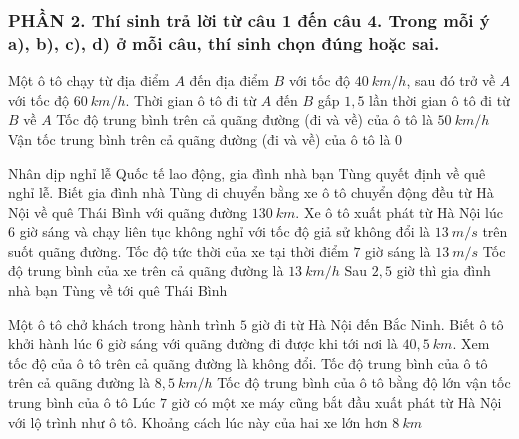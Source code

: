 \subsubsection*{PHẦN 2. Thí sinh trả lời từ câu 1 đến câu 4. Trong mỗi ý a), b), c), d) ở mỗi câu, thí sinh chọn đúng hoặc sai.}
\setcounter{ex}{0}
\begin{ex}%
Một ô tô chạy từ địa điểm $A$ đến địa điểm $B$ với tốc độ $40 \ km/h$, sau đó trở về $A$ với tốc độ $60\ km/h$.
{\True Thời gian ô tô đi từ $A$ đến $B$ gấp $1,5$ lần thời gian ô tô đi từ $B$ về $A$} 
{Tốc độ trung bình trên cả quãng đường (đi và về) của ô tô là $50 \ km/h$} 
{\True Vận tốc trung bình trên cả quãng đường (đi và về) của ô tô là $0$} 
\loigiai{ 
\begin{itemchoice}
\itemch
\itemch
\itemch
\itemch
\end{itemchoice}
}
\end{ex}
\begin{ex}%
Nhân dịp nghỉ lễ Quốc tế lao động, gia đình nhà bạn Tùng quyết định về quê nghỉ lễ. Biết gia đình nhà Tùng di chuyển bằng xe ô tô chuyển động đều từ Hà Nội về quê Thái Bình với quãng đường $130\ km$. Xe ô tô xuất phát từ Hà Nội lúc $6$ giờ sáng và chạy liên tục không nghỉ với tốc độ giả sử không đổi là $13\ m/s$ trên suốt quãng đường.
{\True Tốc độ tức thời của xe tại thời điểm $7$ giờ sáng là $13 \ m/s$} 
{Tốc độ trung bình của xe trên cả quãng đường là $13 \ km/h$} 
{Sau $2,5$ giờ thì gia đình nhà bạn Tùng về tới quê Thái Bình} 
\loigiai{ 
\begin{itemchoice}
\itemch
\itemch
\itemch
\itemch
\end{itemchoice}
}
\end{ex}
\begin{ex}%
Một ô tô chở khách trong hành trình $5$ giờ đi từ Hà Nội đến Bắc Ninh. Biết ô tô khởi hành lúc $6$ giờ sáng với quãng đường đi được khi tới nơi là $40,5 \ km$. Xem tốc độ của ô tô trên cả quãng đường là không đổi.
{Tốc độ trung bình của ô tô trên cả quãng đường là $8,5\ km/h$} 
{\True Tốc độ trung bình của ô tô bằng độ lớn vận tốc trung bình của ô tô} 
{\True Lúc $7$ giờ có một xe máy cũng bắt đầu xuất phát từ Hà Nội với lộ trình như ô tô. Khoảng cách lúc này của hai xe lớn hơn $8\ km$} 
\loigiai{ 
\begin{itemchoice}
\itemch
\itemch
\itemch
\itemch
\end{itemchoice}
}
\end{ex}
